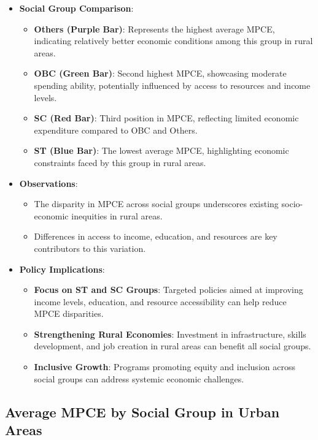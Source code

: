 \documentclass{article}
\begin{document}
\begin{itemize}
	\item \textbf{Social Group Comparison}: 
	\begin{itemize}
		\item \textbf{Others (Purple Bar)}: Represents the highest average MPCE, indicating relatively better economic conditions among this group in rural areas.
		\item \textbf{OBC (Green Bar)}: Second highest MPCE, showcasing moderate spending ability, potentially influenced by access to resources and income levels.
		\item \textbf{SC (Red Bar)}: Third position in MPCE, reflecting limited economic expenditure compared to OBC and Others.
		\item \textbf{ST (Blue Bar)}: The lowest average MPCE, highlighting economic constraints faced by this group in rural areas.
	\end{itemize}
	\item \textbf{Observations}:
	\begin{itemize}
		\item The disparity in MPCE across social groups underscores existing socio-economic inequities in rural areas.
		\item Differences in access to income, education, and resources are key contributors to this variation.
	\end{itemize}
	\item \textbf{Policy Implications}:
	\begin{itemize}
		\item \textbf{Focus on ST and SC Groups}: Targeted policies aimed at improving income levels, education, and resource accessibility can help reduce MPCE disparities.
		\item \textbf{Strengthening Rural Economies}: Investment in infrastructure, skills development, and job creation in rural areas can benefit all social groups.
		\item \textbf{Inclusive Growth}: Programs promoting equity and inclusion across social groups can address systemic economic challenges.
	\end{itemize}
\end{itemize}







\newpage
\subsection{Average MPCE by Social Group in Urban Areas}
\end{document}
